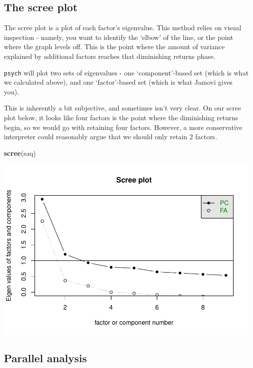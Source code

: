 \documentclass[
]{book}
\newenvironment{Shaded}{\begin{snugshade}}{\end{snugshade}}
\newcommand{\FunctionTok}[1]{\textcolor[rgb]{0.13,0.29,0.53}{\textbf{#1}}}
\newcommand{\NormalTok}[1]{#1}
\begin{document}
\subsection{The scree plot}\label{the-scree-plot}

The scree plot is a plot of each factor's eigenvalue. This method relies on visual inspection - namely, you want to identify the `elbow' of the line, or the point where the graph levels off. This is the point where the amount of variance explained by additional factors reaches that diminishing returns phase.

\texttt{psych} will plot two sets of eigenvalues - one `component'-based set (which is what we calculated above), and one `factor'-based set (which is what Jamovi gives you).

This is inherently a bit subjective, and sometimes isn't very clear. On our scree plot below, it looks like four factors is the point where the diminishing returns begin, so we would go with retaining four factors. However, a more conservative interpreter could reasonably argue that we should only retain 2 factors.

\begin{Shaded}
\begin{Highlighting}[]
\FunctionTok{scree}\NormalTok{(saq)}
\end{Highlighting}
\end{Shaded}

\includegraphics{_main_files/figure-latex/unnamed-chunk-333-1.pdf}

\subsection{Parallel analysis}\label{parallel-analysis}
\end{document}
